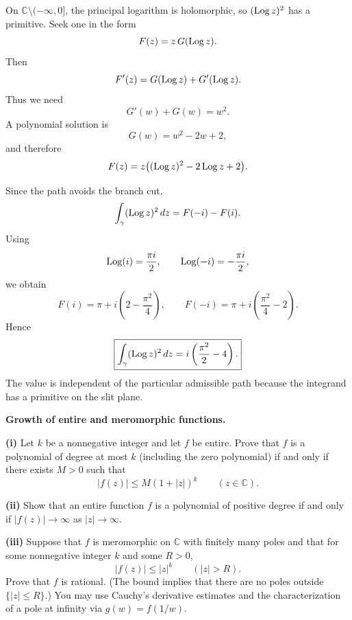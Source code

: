 

\begin{solution}
On \(\mathbb C\setminus(-\infty,0]\), the principal logarithm is holomorphic, so \((\operatorname{Log} z)^2\) has a primitive. Seek one in the form
\[
F(z)=z\,G(\operatorname{Log} z).
\]
Then
\[
F'(z)=G(\operatorname{Log} z)+G'(\operatorname{Log} z).
\]
Thus we need
\[
G'(w)+G(w)=w^2.
\]
A polynomial solution is
\[
G(w)=w^2-2w+2,
\]
and therefore
\[
F(z)=z\bigl((\operatorname{Log} z)^2-2\operatorname{Log} z+2\bigr).
\]

Since the path avoids the branch cut,
\[
\int_\gamma (\operatorname{Log} z)^2\,dz=F(-i)-F(i).
\]
Using
\[
\operatorname{Log}(i)=\frac{\pi i}{2},
\qquad
\operatorname{Log}(-i)=-\frac{\pi i}{2},
\]
we obtain
\[
F(i)=\pi+i\left(2-\frac{\pi^2}{4}\right),
\qquad
F(-i)=\pi+i\left(\frac{\pi^2}{4}-2\right).
\]
Hence
\[
\boxed{
\int_\gamma (\operatorname{Log} z)^2\,dz
=
i\left(\frac{\pi^2}{2}-4\right).
}
\]
The value is independent of the particular admissible path because the integrand has a primitive on the slit plane.
\end{solution}


\begin{problem}[CP-IV-0061]
\label{prob:cp-iv-0061}
\textbf{Growth of entire and meromorphic functions.}
\par\noindent\textbf{(i)} Let $k$ be a nonnegative integer and let $f$ be entire. Prove that $f$ is a
polynomial of degree at most $k$ (including the zero polynomial) if and only if
there exists $M>0$ such that
\[
|f(z)|\le M(1+|z|)^k\qquad(z\in\mathbb C).
\]
\par\medskip\noindent\textbf{(ii)} Show that an entire function $f$ is a polynomial of positive degree if and only if
$|f(z)|\to\infty$ as $|z|\to\infty$.
\par\medskip\noindent\textbf{(iii)} Suppose that $f$ is meromorphic on $\mathbb C$ with finitely many poles and
that for some nonnegative integer $k$ and some $R>0$,
\[
|f(z)|\le |z|^k\qquad(|z|>R).
\]
Prove that $f$ is rational. (The bound implies that there are no poles outside
$\{|z|\le R\}$.)
You may use Cauchy's derivative estimates and the characterization of a pole
at infinity via $g(w)=f(1/w)$.
\end{problem}

